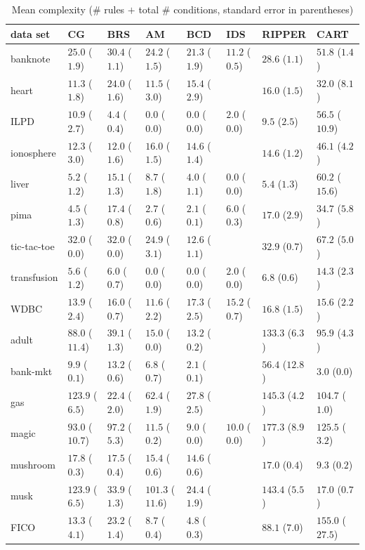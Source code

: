 \documentclass[twoside,11pt]{article}
\begin{document}
\begin{table}
\footnotesize
\caption{Mean complexity (\# rules $+$ total \# conditions, standard error in parentheses)}
\label{tbl:suppComplex}
\centering
\begin{tabular}{llllllll}
\toprule
data set&CG&BRS&AM&BCD&IDS&RIPPER&CART\\
\midrule
banknote&$25.0$ ($1.9$)&$30.4$ ($1.1$)&$24.2$ ($1.5$)&$21.3$ ($1.9$)&$11.2$ ($0.5$)&$28.6$ ($1.1$)&$51.8$ ($1.4$)\\
heart&$11.3$ ($1.8$)&$24.0$ ($1.6$)&$11.5$ ($3.0$)&$15.4$ ($2.9$)&&$16.0$ ($1.5$)&$32.0$ ($8.1$)\\
ILPD&$10.9$ ($2.7$)&$4.4$ ($0.4$)&$0.0$ ($0.0$)&$0.0$ ($0.0$)&$2.0$ ($0.0$)&$9.5$ ($2.5$)&$56.5$ ($10.9$)\\
ionosphere&$12.3$ ($3.0$)&$12.0$ ($1.6$)&$16.0$ ($1.5$)&$14.6$ ($1.4$)&&$14.6$ ($1.2$)&$46.1$ ($4.2$)\\
liver&$5.2$ ($1.2$)&$15.1$ ($1.3$)&$8.7$ ($1.8$)&$4.0$ ($1.1$)&$0.0$ ($0.0$)&$5.4$ ($1.3$)&$60.2$ ($15.6$)\\
pima&$4.5$ ($1.3$)&$17.4$ ($0.8$)&$2.7$ ($0.6$)&$2.1$ ($0.1$)&$6.0$ ($0.3$)&$17.0$ ($2.9$)&$34.7$ ($5.8$)\\
tic-tac-toe&$32.0$ ($0.0$)&$32.0$ ($0.0$)&$24.9$ ($3.1$)&$12.6$ ($1.1$)&&$32.9$ ($0.7$)&$67.2$ ($5.0$)\\
transfusion&$5.6$ ($1.2$)&$6.0$ ($0.7$)&$0.0$ ($0.0$)&$0.0$ ($0.0$)&$2.0$ ($0.0$)&$6.8$ ($0.6$)&$14.3$ ($2.3$)\\
WDBC&$13.9$ ($2.4$)&$16.0$ ($0.7$)&$11.6$ ($2.2$)&$17.3$ ($2.5$)&$15.2$ ($0.7$)&$16.8$ ($1.5$)&$15.6$ ($2.2$)\\
\midrule
adult&$88.0$ ($11.4$)&$39.1$ ($1.3$)&$15.0$ ($0.0$)&$13.2$ ($0.2$)&&$133.3$ ($6.3$)&$95.9$ ($4.3$)\\
bank-mkt&$9.9$ ($0.1$)&$13.2$ ($0.6$)&$6.8$ ($0.7$)&$2.1$ ($0.1$)&&$56.4$ ($12.8$)&$3.0$ ($0.0$)\\
gas&$123.9$ ($6.5$)&$22.4$ ($2.0$)&$62.4$ ($1.9$)&$27.8$ ($2.5$)&&$145.3$ ($4.2$)&$104.7$ ($1.0$)\\
magic&$93.0$ ($10.7$)&$97.2$ ($5.3$)&$11.5$ ($0.2$)&$9.0$ ($0.0$)&$10.0$ ($0.0$)&$177.3$ ($8.9$)&$125.5$ ($3.2$)\\
mushroom&$17.8$ ($0.3$)&$17.5$ ($0.4$)&$15.4$ ($0.6$)&$14.6$ ($0.6$)&&$17.0$ ($0.4$)&$9.3$ ($0.2$)\\
musk&$123.9$ ($6.5$)&$33.9$ ($1.3$)&$101.3$ ($11.6$)&$24.4$ ($1.9$)&&$143.4$ ($5.5$)&$17.0$ ($0.7$)\\
FICO&$13.3$ ($4.1$)&$23.2$ ($1.4$)&$8.7$ ($0.4$)&$4.8$ ($0.3$)&&$88.1$ ($7.0$)&$155.0$ ($27.5$)\\
\bottomrule
\end{tabular}
\end{table}
\end{document}

